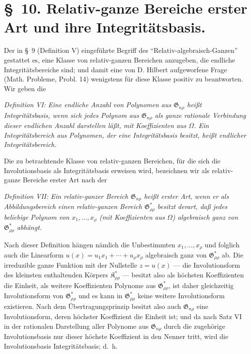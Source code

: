 \documentclass[11pt]{article}
\providecommand{\Kfield}{\mathfrak{K}}
\providecommand{\Gdom}{\mathfrak{G}}
\begin{document}
\section*{\S\ 10. Relativ-ganze Bereiche erster Art und ihre Integritätsbasis.}

Der in \S\ 9 (Definition V) eingeführte Begriff des ``Relativ-algebraisch-Ganzen'' gestattet es, eine Klasse von relativ-ganzen Bereichen anzugeben, die endliche Integritätsbereiche sind; und damit eine von D. Hilbert aufgeworfene Frage (Math. Probleme, Probl. 14) wenigstens für diese Klasse positiv zu beantworten. Wir geben die

\emph{Definition VI: Eine endliche Anzahl von Polynomen aus $\Gdom_{n\rho}$ heißt Integritätsbasis, wenn sich jedes Polynom aus $\Gdom_{n\rho}$ als ganze rationale Verbindung dieser endlichen Anzahl darstellen läßt, mit Koeffizienten aus $\Omega$. Ein Integritätsbereich aus Polynomen, der eine Integritätsbasis besitzt, heißt endlicher Integritätsbereich.}

Die zu betrachtende Klasse von relativ-ganzen Bereichen, für die sich die Involutionsbasis als Integritätsbasis erweisen wird, bezeichnen wir als relativ-ganze Bereiche erster Art nach der

\emph{Definition VII: Ein relativ-ganzer Bereich $\Gdom_{n\rho}$ heißt erster Art, wenn er als Abbildungsbereich einen relativ-ganzen Bereich $\Gdom^*_{\rho\rho}$ besitzt derart, daß jedes beliebige Polynom von $x_1,
\ldots,x_\rho$ (mit Koeffizienten aus $\Omega$) algebraisch ganz von $\Gdom^*_{\rho\rho}$ abhängt.}

Nach dieser Definition hängen nämlich die Unbestimmten $x_1,
\ldots,x_\rho$ und folglich auch die Linearform $u(x)=u_1x_1+\cdots+u_\rho x_\rho$ algebraisch ganz von $\Gdom^*_{\rho\rho}$ ab. Die irreduzible ganze Funktion mit der Nullstelle $z=u(x)$ --- die Involutionsform des kleinsten enthaltenden Körpers $\Kfield^*_{\rho\rho}$ --- besitzt also als höchsten Koeffizienten die Einheit, als weitere Koeffizienten Polynome aus $\Gdom^*_{\rho\rho}$, ist daher gleichzeitig Involutionsform von $\Gdom^*_{\rho\rho}$ und es kann in $\Gdom^*_{\rho\rho}$ keine weitere Involutionsform existieren. Nach dem Übertragungsprinzip besitzt also auch $\Gdom_{n\rho}$ eine Involutionsform, deren höchster Koeffizient die Einheit ist; und da nach Satz VI in der rationalen Darstellung aller Polynome aus $\Gdom_{n\rho}$ durch die zugehörige Involutionsbasis nur dieser höchste Koeffizient in den Nenner tritt, wird die Involutionsbasis Integritätsbasis; d.~h.
\end{document}

